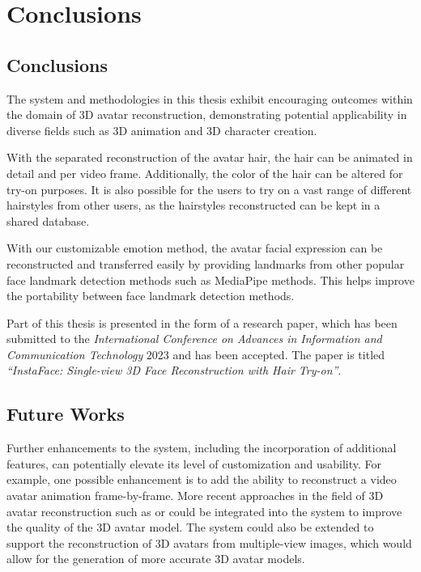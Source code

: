 \section{Conclusions}\label{sec:conclusions}

\subsection{Conclusions}

The system and methodologies in this thesis exhibit encouraging outcomes within the domain of 3D avatar reconstruction, demonstrating potential applicability in diverse fields such as 3D animation and 3D character creation.

With the separated reconstruction of the avatar hair, the hair can be animated in detail and per video frame. Additionally, the color of the hair can be altered for try-on purposes. It is also possible for the users to try on a vast range of different hairstyles from other users, as the hairstyles reconstructed can be kept in a shared database.

With our customizable emotion method, the avatar facial expression can be reconstructed and transferred easily by providing landmarks from other popular face landmark detection methods such as MediaPipe \cite{lugaresiMediaPipeFrameworkBuilding2019} methods. This helps improve the portability between face landmark detection methods.

Part of this thesis is presented in the form of a research paper, which has been submitted to the \textit{International Conference on Advances in Information and Communication Technology} 2023 and has been accepted. The paper is titled \textit{``InstaFace: Single-view 3D Face Reconstruction with Hair Try-on''}.

\subsection{Future Works}

Further enhancements to the system, including the incorporation of additional features, can potentially elevate its level of customization and usability. For example, one possible enhancement is to add the ability to reconstruct a video avatar animation frame-by-frame. More recent approaches in the field of 3D avatar reconstruction such as  or  could be integrated into the system to improve the quality of the 3D avatar model. The system could also be extended to support the reconstruction of 3D avatars from multiple-view images, which would allow for the generation of more accurate 3D avatar models.